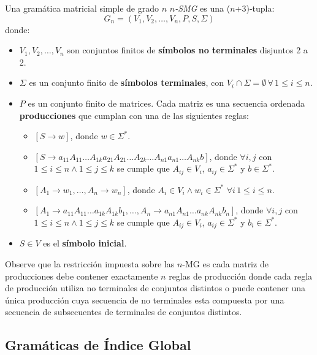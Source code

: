 \documentclass{article}
\begin{document}
Una gramática matricial simple de grado $n$ \textit{$n$-SMG} es una ($n$+3)-tupla:
$$
      G_n=(V_1,V_2,\ldots,V_n,P,S,\Sigma)
$$
donde:
\begin{itemize}
      \item \( V_1, V_2, \ldots, V_n \) son conjuntos finitos de \textbf{símbolos no terminales} disjuntos 2 a 2.
      \item \( \Sigma \) es un conjunto finito de \textbf{símbolos terminales}, con \( V_i \cap \Sigma = \emptyset\,\forall\,1\leq i\leq n \).
      \item \( P \) es un conjunto finito de matrices. Cada matriz es una secuencia ordenada \textbf{producciones} que cumplan con una de las siguientes reglas:
            \begin{itemize}
                  \item $[S\to w]$, donde $w\in \Sigma ^*$.
                  \item $[S\to a_{11}A_{11}\ldots A_{1k}a_{21}A_{21}\ldots A_{2k}\ldots A_{n1}a_{n1}\ldots A_{nk}b]$,
                        donde $\forall i,j$ con $1\leq i\leq n\wedge 1\leq j\leq k$ se cumple que
                        $A_{ij}\in V_i$, $a_{ij}\in \Sigma ^*$ y $b\in \Sigma ^*$.
                  \item $[A_1\to w_1,\ldots, A_n\to w_n]$, donde $A_i\in V_i\wedge w_i\in \Sigma ^*$ $\forall i\, 1\leq i\leq n$.
                  \item $[A_1 \to a_{11}A_{11}\ldots a_{1k}A_{1k}b_1,\ldots,A_n \to a_{n1}A_{n1}\ldots a_{nk}A_{nk}b_n]$, donde $\forall i,j$
                        con $1\leq i\leq n\wedge 1\leq j\leq k$ se cumple que
                        $A_{ij}\in V_i$, $a_{ij}\in \Sigma ^*$ y $b_{i}\in \Sigma ^*$.
            \end{itemize}
      \item \( S \in V \) es el \textbf{símbolo inicial}.
\end{itemize}


Observe que la restricción impuesta sobre las $n$-MG es cada matriz de producciones debe contener exactamente $n$ reglas de producción
donde cada regla de producción utiliza no terminales de conjuntos distintos o puede contener una única producción cuya secuencia de no terminales
esta compuesta por una secuencia de subsecuentes de terminales de conjuntos distintos.

\subsection{Gramáticas de Índice Global}
\end{document}
